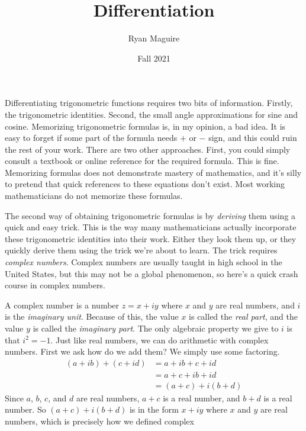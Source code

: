 \documentclass{article}
\title{Differentiation}
\author{Ryan Maguire}
\date{Fall 2021}
\theoremstyle{normal}
\theoremstyle{plain}
\begin{document}
    \maketitle
    Differentiating trigonometric functions requires two bits of information.
    Firstly, the trigonometric identities. Second, the small angle
    approximations for sine and cosine. Memorizing trigonometric formulas is,
    in my opinion, a bad idea. It is easy to forget if some part of the formula
    needs $+$ or $-$ sign, and this could ruin the rest of your work. There are
    two other approaches. First, you could simply consult a textbook or online
    reference for the required formula. This is fine. Memorizing formulas does
    not demonstrate mastery of mathematics, and it's silly to pretend that
    quick references to these equations don't exist. Most working
    mathematicians do not memorize these formulas.
    \par\hfill\par
    The second way of obtaining trigonometric formulas is by \textit{deriving}
    them using a quick and easy trick. This is the way many mathematicians
    actually incorporate these trigonometric identities into their work. Either
    they look them up, or they quickly derive them using the trick we're about
    to learn. The trick requires \textit{complex numbers}. Complex numbers are
    usually taught in high school in the United States, but this may not be a
    global phenomenon, so here's a quick crash course in complex numbers.
    \par\hfill\par
    A complex number is a number $z=x+iy$ where $x$ and $y$ are real numbers,
    and $i$ is the \textit{imaginary unit}. Because of this, the value $x$ is
    called the \textit{real part}, and the value $y$ is called the
    \textit{imaginary part}. The only algebraic property we
    give to $i$ is that $i^{2}=-1$. Just like real numbers, we can do
    arithmetic with complex numbers. First we ask how do we add them? We simply
    use some factoring.
    \begin{align}
        (a+ib)+(c+id)
            &=a+ib+c+id\\
            &=a+c+ib+id\\
            &=(a+c)+i(b+d)
    \end{align}
    Since $a$, $b$, $c$, and $d$ are real numbers, $a+c$ is a real number, and
    $b+d$ is a real number. So $(a+c)+i(b+d)$ is in the form $x+iy$ where
    $x$ and $y$ are real numbers, which is precisely how we defined complex
\end{document}
